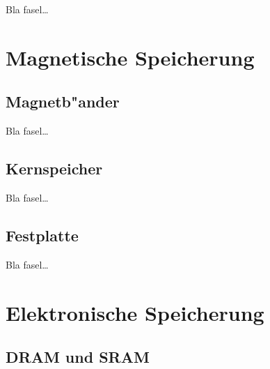             Bla fasel\ldots
    
    
    \section{Magnetische Speicherung}
    \label{ch:Technisch:sec:Magnetische Speicherung}
        \subsection{Magnetb"ander}
        \label{ch:Technisch:sec:Magnetische Speicherung:sub:Magnetb"ander}
        
            Bla fasel\ldots
            
        \subsection{Kernspeicher}
        \label{ch:Technisch:sec:Magnetische Speicherung:sub:Kernspeicher}
        
            Bla fasel\ldots
            
        \subsection{Festplatte}
        \label{ch:Technisch:sec:Magnetische Speicherung:sub:Festplatte}
        
            Bla fasel\ldots
    
    \section{Elektronische Speicherung}
    \label{ch:Technisch:sec:Elektronische Speicherung}
        \subsection{DRAM und SRAM}
        \label{ch:Technisch:sec:Elektronische Speicherung:sub:DRAM und SRAM}
        
